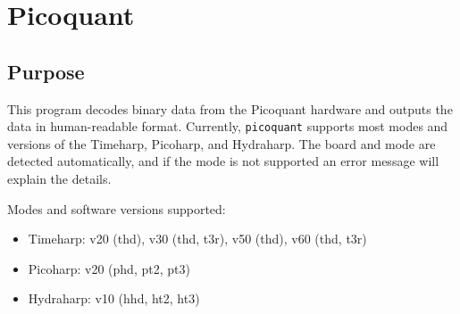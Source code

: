 \documentclass{article}
\newcommand{\braces}[1]{\ensuremath{\left\lbrace #1 \right\rbrace}}
\newcommand{\picoquant}{\texttt{picoquant}}
\newcommand{\gn}[1]{\ensuremath{g^{(#1)}}}
\newcommand{\abs}[1]{\ensuremath{\left|#1\right|}}
\newcommand{\resolution}{\ensuremath{\epsilon}}
\begin{document}
%

\section{Picoquant}
\subsection{Purpose}
This program decodes binary data from the Picoquant hardware and outputs the data in human-readable format. Currently, \picoquant{} supports most modes and versions of the Timeharp, Picoharp, and Hydraharp. The board and mode are detected automatically, and if the mode is not supported an error message will explain the details.

Modes and software versions supported:
\begin{itemize}
\item Timeharp: v20 (thd), v30 (thd, t3r), v50 (thd), v60 (thd, t3r)
\item Picoharp: v20 (phd, pt2, pt3)
\item Hydraharp: v10 (hhd, ht2, ht3)
\end{itemize}
\end{document}
